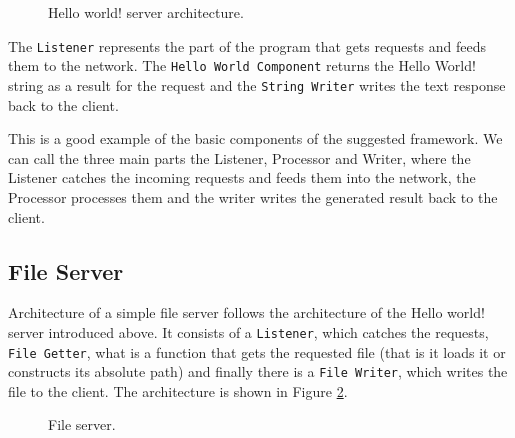 \documentclass[12pt,a4paper]{article}
\begin{document}
\begin{figure}[h]
\centering
{}
\caption[scale=1.0]{Hello world! server architecture.}
\label{fig:helloWorld}
\end{figure}

The \texttt{Listener} represents the 
part of the program that gets requests and feeds them to the network.
The \texttt{Hello World Component} returns the Hello World! string as a result 
for the request and the \texttt{String Writer} writes the text response 
back to the client.

This is a good example of the basic components of the suggested framework.
We can call the three main parts the Listener, Processor and Writer, where
the Listener catches the incoming requests and feeds them into the network,
the Processor processes them and the writer writes the generated result 
back to the client.

\subsection{File Server}
Architecture of a simple file server follows the architecture of the Hello world!
server introduced above. It consists of a \texttt{Listener}, which catches the requests,
\texttt{File Getter}, what is a function that gets the requested file (that is it loads it or 
constructs its absolute path) and finally there is a \texttt{File Writer}, which
writes the file to the client. The architecture is shown in Figure \ref{fig:fileServer}.
\\
\begin{figure}[h]
\centering
{}
\caption[scale=1.0]{File server.}
\label{fig:fileServer}
\end{figure}
\end{document}
